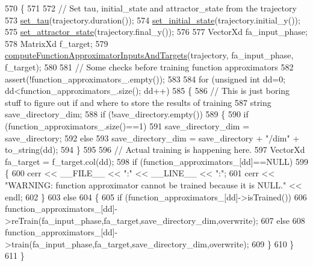 \begin{DoxyCode}
570 \{
571   
572   \textcolor{comment}{// Set tau, initial\_state and attractor\_state from the trajectory }
573   \hyperlink{classDmpBbo_1_1Dmp_a17edb45ef62a4ef7f8c78e4f8f68b249}{set\_tau}(trajectory.duration());
574   \hyperlink{classDmpBbo_1_1Dmp_ad4e11c676c2add8a992db1caf542f0a0}{set\_initial\_state}(trajectory.initial\_y());
575   \hyperlink{classDmpBbo_1_1Dmp_a6dccbd077acfd148f528a48a72a4003f}{set\_attractor\_state}(trajectory.final\_y());
576   
577   VectorXd fa\_input\_phase;
578   MatrixXd f\_target;
579   \hyperlink{classDmpBbo_1_1Dmp_a9aef6cbf41e55caa12b62cff77cf1fda}{computeFunctionApproximatorInputsAndTargets}(trajectory, 
      fa\_input\_phase, f\_target);
580   
581   \textcolor{comment}{// Some checks before training function approximators}
582   assert(!function\_approximators\_.empty());
583   
584   \textcolor{keywordflow}{for} (\textcolor{keywordtype}{unsigned} \textcolor{keywordtype}{int} dd=0; dd<function\_approximators\_.size(); dd++)
585   \{
586     \textcolor{comment}{// This is just boring stuff to figure out if and where to store the results of training}
587     \textcolor{keywordtype}{string} save\_directory\_dim;
588     \textcolor{keywordflow}{if} (!save\_directory.empty())
589     \{
590       \textcolor{keywordflow}{if} (function\_approximators\_.size()==1)
591         save\_directory\_dim = save\_directory;
592       \textcolor{keywordflow}{else}
593         save\_directory\_dim = save\_directory + \textcolor{stringliteral}{"/dim"} + to\_string(dd);
594     \}
595     
596     \textcolor{comment}{// Actual training is happening here.}
597     VectorXd fa\_target = f\_target.col(dd);
598     \textcolor{keywordflow}{if} (function\_approximators\_[dd]==NULL)
599     \{
600       cerr << \_\_FILE\_\_ << \textcolor{stringliteral}{":"} << \_\_LINE\_\_ << \textcolor{stringliteral}{":"};
601       cerr << \textcolor{stringliteral}{"WARNING: function approximator cannot be trained because it is NULL."} << endl;
602     \}
603     \textcolor{keywordflow}{else}
604     \{
605       \textcolor{keywordflow}{if} (function\_approximators\_[dd]->isTrained())
606         function\_approximators\_[dd]->reTrain(fa\_input\_phase,fa\_target,save\_directory\_dim,overwrite);
607       \textcolor{keywordflow}{else}
608         function\_approximators\_[dd]->train(fa\_input\_phase,fa\_target,save\_directory\_dim,overwrite);
609     \}
610   \}
611 \}
\end{DoxyCode}


